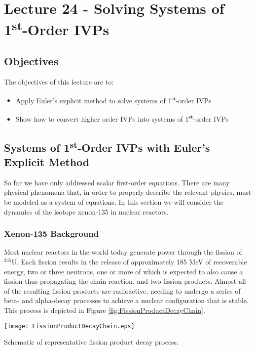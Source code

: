 \chapter{Lecture 24 - Solving Systems of 1\textsuperscript{st}-Order IVPs}
\label{ch:lec24n}
\section{Objectives}
The objectives of this lecture are to:
\begin{itemize}
\item Apply Euler's explicit method to solve systems of 1\textsuperscript{st}-order IVPs
\item Show how to convert higher order IVPs into systems of 1\textsuperscript{st}-order IVPs
\end{itemize}
\setcounter{lstannotation}{0}

\section{Systems of 1\textsuperscript{st}-Order IVPs with Euler's Explicit Method}
So far we have only addressed scalar first-order equations.  There are many physical phenomena that, in order to properly describe the relevant physics, must be modeled as a system of equations.  In this section we will consider the dynamics of the isotope xenon-135 in nuclear reactors.

\subsection{Xenon-135 Background}

Most nuclear reactors in the world today generate power through the fission of $^{235}\text{U}$.  Each fission results in the release of approximately 185 MeV of recoverable energy, two or three neutrons, one or more of which is expected to also cause a fission thus propagating the chain reaction, and two fission products.  Almost all of the resulting fission products are radioactive, needing to undergo a series of beta- and alpha-decay processes to achieve a nuclear configuration that is stable.  This process is depicted in Figure \ref{fig:FissionProductDecayChain}.
\begin{marginfigure}
\texttt{[image: FissionProductDecayChain.eps]}
\caption{Schematic of representative fission product decay process.}
\label{fig:FissionProductDecayChain}
\end{marginfigure}

